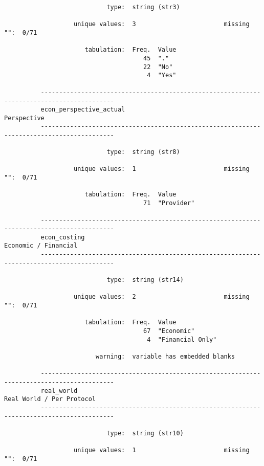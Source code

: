 \documentclass{article}
\begin{document}
\begin{verbatim}
                            type:  string (str3)
          
                   unique values:  3                        missing "":  0/71
          
                      tabulation:  Freq.  Value
                                      45  "."
                                      22  "No"
                                       4  "Yes"
          
          ------------------------------------------------------------------------------------------
          econ_perspective_actual                                                        Perspective
          ------------------------------------------------------------------------------------------
          
                            type:  string (str8)
          
                   unique values:  1                        missing "":  0/71
          
                      tabulation:  Freq.  Value
                                      71  "Provider"
          
          ------------------------------------------------------------------------------------------
          econ_costing                                                          Economic / Financial
          ------------------------------------------------------------------------------------------
          
                            type:  string (str14)
          
                   unique values:  2                        missing "":  0/71
          
                      tabulation:  Freq.  Value
                                      67  "Economic"
                                       4  "Financial Only"
          
                         warning:  variable has embedded blanks
          
          ------------------------------------------------------------------------------------------
          real_world                                                       Real World / Per Protocol
          ------------------------------------------------------------------------------------------
          
                            type:  string (str10)
          
                   unique values:  1                        missing "":  0/71
          

\end{verbatim}
\end{document}
